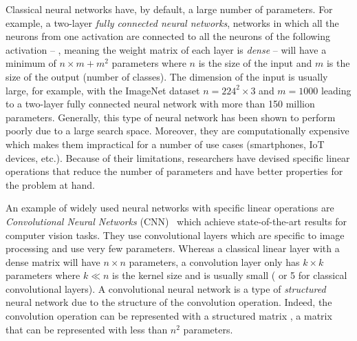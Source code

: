 
Classical neural networks have, by default, a large number of parameters.
For example, a two-layer \emph{fully connected neural networks}, networks in which all the neurons from one activation are connected to all the neurons of the following activation -- \ie, meaning the weight matrix of each layer is \emph{dense} -- will have a minimum of $n \times m + m^2$ parameters where $n$ is the size of the input and $m$ is the size of the output (number of classes).
The dimension of the input is usually large, for example, with the ImageNet dataset $n = 224^2 \times 3$ and $m = 1000$ leading to a two-layer fully connected neural network with more than 150 million parameters.
Generally, this type of neural network has been shown to perform poorly due to a large search space. %
Moreover, they are computationally expensive which makes them impractical for a number of use cases (smartphones, IoT devices, etc.).
Because of their limitations, researchers have devised specific linear operations that reduce the number of parameters and have better properties for the problem at hand.

An example of widely used neural networks with specific linear operations are \emph{Convolutional Neural Networks} (CNN)~\cite{lecun1998gradient,krizhevsky2012imagenet,he2016deep,tan2019efficientnet} which achieve state-of-the-art results for computer vision tasks.
They use convolutional layers which are specific to image processing and use very few parameters.  
Whereas a classical linear layer with a dense matrix will have $n \times n$ parameters, a convolution layer only has $k \times k$ parameters where $k \ll n$ is the kernel size and is usually small ( or 5 for classical convolutional layers).
A convolutional neural network is a type of \emph{structured} neural network due to the structure of the convolution operation.
Indeed, the convolution operation can be represented with a structured matrix \ie, a matrix that can be represented with less than $n^2$ parameters.

